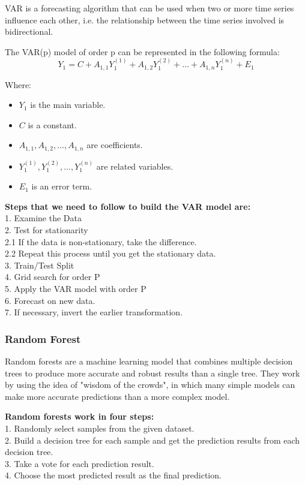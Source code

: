 \documentclass{ieeeojies}
\begin{document}
VAR is a forecasting algorithm that can be used when two or more time series influence each other, i.e. the relationship between the time series involved is bidirectional.\cite{a14}

The VAR(p) model of order p can be represented in the following formula: \cite{a15}
\begin{equation}
    Y_{1} = C + A_{1,1}Y_{1}^{(1)} + A_{1,2}Y_{1}^{(2)} + \ldots + A_{1,n}Y_{1}^{(n)} + E_{1}
\end{equation}

Where:
\begin{itemize}
    \item \( Y_{1} \) is the main variable.
    \item \( C \) is a constant.
    \item \( A_{1,1}, A_{1,2}, \ldots, A_{1,n} \) are coefficients.
    \item \( Y_{1}^{(1)}, Y_{1}^{(2)}, \ldots, Y_{1}^{(n)} \) are related variables.
    \item \( E_{1} \) is an error term.
\end{itemize}


\textbf{Steps that we need to follow to build the VAR model are:} \\
1. Examine the Data \\
2. Test for stationarity\\
2.1 If the data is non-stationary, take the difference.\\
2.2 Repeat this process until you get the stationary data.\\
3. Train/Test Split\\
4. Grid search for order P\\
5. Apply the VAR model with order P\\
6. Forecast on new data.\\
7. If necessary, invert the earlier transformation.

\subsubsection{\textbf{Random Forest}}
\hspace{1em}Random forests are a machine learning model that combines multiple decision trees to produce more accurate and robust results than a single tree. They work by using the idea of "wisdom of the crowds", in which many simple models can make more accurate predictions than a more complex model.\cite{a9}

\textbf{Random forests work in four steps:}
\\1.	Randomly select samples from the given dataset.
\\2.	Build a decision tree for each sample and get the prediction results from each decision tree.
\\3.	Take a vote for each prediction result.
\\4.	Choose the most predicted result as the final prediction.
\end{document}
